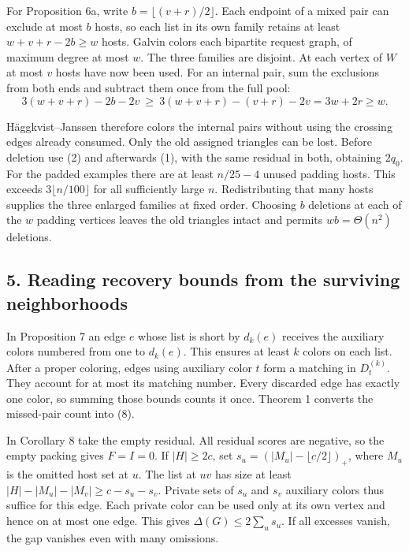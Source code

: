 \documentclass[english,11pt,a4paper]{article}
\begin{document}
For Proposition 6a, write \(b=\lfloor(v+r)/2\rfloor\). Each endpoint of a mixed pair can exclude at most \(b\) hosts, so each list in its own family retains at least \(w+v+r-2b\ge w\) hosts. Galvin colors each bipartite request graph, of maximum degree at most \(w\). The three families are disjoint. At each vertex of \(W\) at most \(v\) hosts have now been used. For an internal pair, sum the exclusions from both ends and subtract them once from the full pool:
\[
3(w+v+r)-2b-2v\ \ge\ 3(w+v+r)-(v+r)-2v=3w+2r\ge w.
\]

Häggkvist--Janssen therefore colors the internal pairs without using the crossing edges already consumed. Only the old assigned triangles can be lost. Before deletion use (2) and afterwards (1), with the same residual in both, obtaining \(2q_0\). For the padded examples there are at least \(n/25-4\) unused padding hosts. This exceeds \(3\lfloor n/100\rfloor\) for all sufficiently large \(n\). Redistributing that many hosts supplies the three enlarged families at fixed order. Choosing \(b\) deletions at each of the \(w\) padding vertices leaves the old triangles intact and permits \(wb=\Theta(n^2)\) deletions.

\subsection{5. Reading recovery bounds from the surviving neighborhoods}\label{reading-recovery-bounds-from-the-surviving-neighborhoods}

In Proposition 7 an edge \(e\) whose list is short by \(d_k(e)\) receives the auxiliary colors numbered from one to \(d_k(e)\). This ensures at least \(k\) colors on each list. After a proper coloring, edges using auxiliary color \(t\) form a matching in \(D_t^{(k)}\). They account for at most its matching number. Every discarded edge has exactly one color, so summing those bounds counts it once. Theorem 1 converts the missed-pair count into (8).

In Corollary 8 take the empty residual. All residual scores are negative, so the empty packing gives \(F=I=0\). If \(|H|\ge2c\), set \(s_u=(|M_u|-\lfloor c/2\rfloor)_+\), where \(M_u\) is the omitted host set at \(u\). The list at \(uv\) has size at least \(|H|-|M_u|-|M_v|\ge c-s_u-s_v\). Private sets of \(s_u\) and \(s_v\) auxiliary colors thus suffice for this edge. Each private color can be used only at its own vertex and hence on at most one edge. This gives \(\Delta(G)\le2\sum_u s_u\). If all excesses vanish, the gap vanishes even with many omissions.
\end{document}
